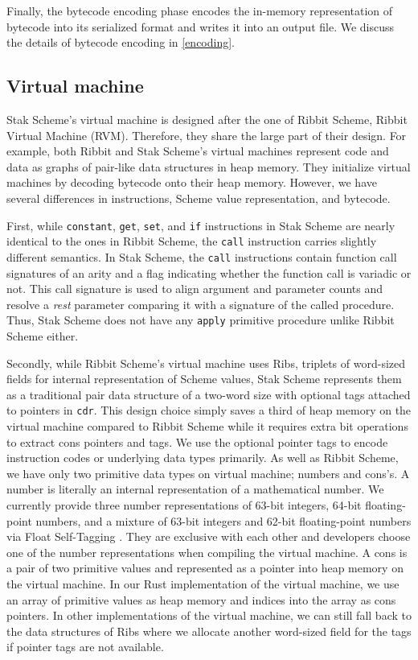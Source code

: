\documentclass[sigplan, anonymous, review]{acmart}
\begin{document}
Finally, the bytecode encoding phase encodes the in-memory representation of
bytecode into its serialized format and writes it into an output file.
We discuss the details of bytecode encoding in \ref{encoding}.

\subsection{Virtual machine} \label{vm}

Stak Scheme's virtual machine is designed after the one of Ribbit
Scheme, Ribbit Virtual Machine (RVM).
Therefore, they share the large part of their design.
For example, both Ribbit and Stak Scheme's virtual machines represent
code and data as graphs of pair-like data structures in heap memory.
They initialize virtual machines by decoding bytecode onto
their heap memory.
However, we have several differences in instructions, Scheme value
representation, and bytecode.

First, while \texttt{constant}, \texttt{get}, \texttt{set}, and
\texttt{if} instructions in Stak Scheme are nearly identical to the ones in
Ribbit Scheme, the \texttt{call} instruction carries slightly
different semantics.
In Stak Scheme, the \texttt{call} instructions
contain function call signatures of an arity and
a flag indicating whether the function call is variadic or not.
This call signature is used to align argument and parameter counts and
resolve a \textit{rest} parameter comparing it with a signature of
the called procedure.
Thus, Stak Scheme does not have any \texttt{apply} primitive
procedure unlike Ribbit Scheme either.

Secondly, while Ribbit Scheme's virtual machine uses Ribs, triplets of
word-sized fields for internal representation of Scheme values, Stak
Scheme represents them as a traditional pair data structure of a
two-word size with optional tags attached to pointers in \texttt{cdr}.
This design choice simply saves a third of heap memory on the virtual machine
compared to Ribbit Scheme while it requires extra bit operations to
extract cons pointers and tags.
We use the optional pointer tags to encode instruction
codes or underlying data types primarily.
As well as Ribbit Scheme, we have only two primitive data types on virtual
machine; numbers and cons's.
A number is literally an internal representation of a mathematical number.
We currently provide three number
representations of 63-bit integers, 64-bit floating-point numbers,
and a mixture of 63-bit integers and 62-bit floating-point numbers
via Float Self-Tagging \cite{floatselftag}.
They are exclusive with each other and developers choose one
of the number representations when compiling the virtual machine.
A cons is a pair of two primitive values and represented as
a pointer into heap memory on the virtual machine.
In our Rust implementation of the virtual machine, we use an array of
primitive values as heap memory and indices into the array as cons
pointers.
In other implementations of the virtual machine, we can still fall
back to the data structures of Ribs where we allocate another
word-sized field for the tags if pointer tags are not available.
\end{document}
